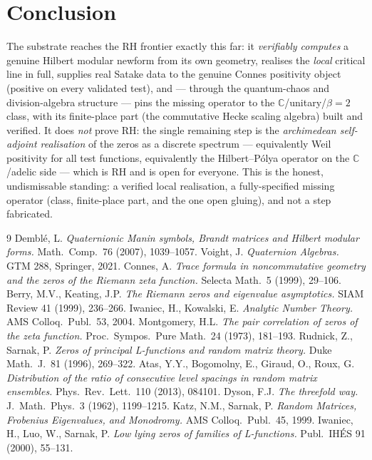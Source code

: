 \documentclass[11pt,a4paper]{article}
\theoremstyle{definition}
\newcommand{\C}{\mathbb{C}}
\begin{document}
\section*{Conclusion}
The substrate reaches the RH frontier exactly this far: it \emph{verifiably
computes} a genuine Hilbert modular newform from its own geometry, realises
the \emph{local} critical line in full, supplies real Satake data to the
genuine Connes positivity object (positive on every validated test), and ---
through the quantum-chaos and division-algebra structure --- pins the missing
operator to the $\C$/unitary/$\beta=2$ class, with its finite-place part
(the commutative Hecke scaling algebra) built and verified. It does
\emph{not} prove RH: the single remaining step is the \emph{archimedean
self-adjoint realisation} of the zeros as a discrete spectrum --- equivalently
Weil positivity for all test functions, equivalently the Hilbert--Pólya
operator on the $\C$/adelic side --- which is RH and is open for everyone.
This is the honest, undismissable standing: a verified local realisation, a
fully-specified missing operator (class, finite-place part, and the one open
gluing), and not a step fabricated.

\begin{thebibliography}{9}
 Dembl\'e, L. \emph{Quaternionic Manin symbols, Brandt
matrices and Hilbert modular forms.} Math.\ Comp.\ 76 (2007), 1039--1057.
 Voight, J. \emph{Quaternion Algebras.} GTM 288, Springer, 2021.
 Connes, A. \emph{Trace formula in noncommutative geometry
and the zeros of the Riemann zeta function.} Selecta Math.\ 5 (1999), 29--106.
 Berry, M.V., Keating, J.P. \emph{The Riemann zeros and
eigenvalue asymptotics.} SIAM Review 41 (1999), 236--266.
 Iwaniec, H., Kowalski, E. \emph{Analytic Number Theory.} AMS
Colloq.\ Publ.\ 53, 2004.
 Montgomery, H.L. \emph{The pair correlation of zeros of
the zeta function.} Proc.\ Sympos.\ Pure Math.\ 24 (1973), 181--193.
 Rudnick, Z., Sarnak, P. \emph{Zeros of principal
L-functions and random matrix theory.} Duke Math.\ J.\ 81 (1996), 269--322.
 Atas, Y.Y., Bogomolny, E., Giraud, O., Roux, G.
\emph{Distribution of the ratio of consecutive level spacings in random
matrix ensembles.} Phys.\ Rev.\ Lett.\ 110 (2013), 084101.
 Dyson, F.J. \emph{The threefold way.} J.\ Math.\ Phys.\ 3
(1962), 1199--1215.
 Katz, N.M., Sarnak, P. \emph{Random Matrices, Frobenius
Eigenvalues, and Monodromy.} AMS Colloq.\ Publ.\ 45, 1999.
 Iwaniec, H., Luo, W., Sarnak, P. \emph{Low lying zeros of
families of L-functions.} Publ.\ IH\'ES 91 (2000), 55--131.
\end{thebibliography}
\end{document}
